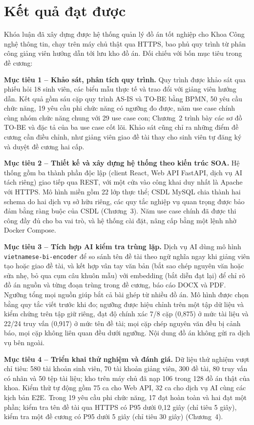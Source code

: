 \documentclass[../main.tex]{subfiles}
\begin{document}
\section*{Kết quả đạt được}

Khóa luận đã xây dựng được hệ thống quản lý đồ án tốt nghiệp cho Khoa Công nghệ thông tin, chạy trên máy chủ thật qua HTTPS, bao phủ quy trình từ phân công giảng viên hướng dẫn tới lưu kho đồ án. Đối chiếu với bốn mục tiêu trong đề cương:

\textbf{Mục tiêu 1 -- Khảo sát, phân tích quy trình.} Quy trình được khảo sát qua phiếu hỏi 18 sinh viên, các biểu mẫu thực tế và trao đổi với giảng viên hướng dẫn. Kết quả gồm sáu cặp quy trình AS-IS và TO-BE bằng BPMN, 50 yêu cầu chức năng, 19 yêu cầu phi chức năng có ngưỡng đo được, năm use case chính cùng nhóm chức năng chung với 29 use case con; Chương~2 trình bày các sơ đồ TO-BE và đặc tả của ba use case cốt lõi. Khảo sát cũng chỉ ra những điểm đề cương cần điều chỉnh, như giảng viên giao đề tài thay cho sinh viên tự đăng ký và duyệt đề cương hai cấp.

\textbf{Mục tiêu 2 -- Thiết kế và xây dựng hệ thống theo kiến trúc SOA.} Hệ thống gồm ba thành phần độc lập (client React, Web API FastAPI, dịch vụ AI tách riêng) giao tiếp qua REST, với một cửa vào công khai duy nhất là Apache với HTTPS. Mô hình miền gồm 22 lớp thực thể; CSDL MySQL chia thành hai schema do hai dịch vụ sở hữu riêng, các quy tắc nghiệp vụ quan trọng được bảo đảm bằng ràng buộc của CSDL (Chương~3). Năm use case chính đã được thi công đầy đủ cho ba vai trò, và hệ thống cài đặt, nâng cấp bằng một lệnh nhờ Docker Compose.

\textbf{Mục tiêu 3 -- Tích hợp AI kiểm tra trùng lặp.} Dịch vụ AI dùng mô hình \texttt{vietnamese-bi-encoder} để so sánh tên đề tài theo ngữ nghĩa ngay khi giảng viên tạo hoặc giao đề tài, và kết hợp vân tay văn bản (bắt sao chép nguyên văn hoặc sửa nhẹ, bỏ qua cụm câu khuôn mẫu) với embedding (bắt diễn đạt lại) để chỉ rõ đồ án nguồn và từng đoạn trùng trong đề cương, báo cáo DOCX và PDF. Ngưỡng tổng mọi nguồn giúp bắt cả bài ghép từ nhiều đồ án. Mô hình được chọn bằng quy tắc viết trước khi đo; ngưỡng được hiệu chỉnh trên một tập dữ liệu và kiểm chứng trên tập giữ riêng, đạt độ chính xác 7/8 cặp (0,875) ở mức tài liệu và 22/24 truy vấn (0,917) ở mức tên đề tài; mọi cặp chép nguyên văn đều bị cảnh báo, mọi cặp không liên quan đều dưới ngưỡng. Nội dung đồ án không gửi ra dịch vụ bên ngoài.

\textbf{Mục tiêu 4 -- Triển khai thử nghiệm và đánh giá.} Dữ liệu thử nghiệm vượt chỉ tiêu: 580 tài khoản sinh viên, 70 tài khoản giảng viên, 300 đề tài, 80 truy vấn có nhãn và 50 tệp tài liệu; kho trên máy chủ đã nạp 106 trong 128 đồ án thật của khoa. Kiểm thử tự động gồm 75 ca cho Web API, 32 ca cho dịch vụ AI cùng các kịch bản E2E. Trong 19 yêu cầu phi chức năng, 17 đạt hoàn toàn và hai đạt một phần; kiểm tra tên đề tài qua HTTPS có P95 dưới 0,12 giây (chỉ tiêu 5 giây), kiểm tra một đề cương có P95 dưới 5 giây (chỉ tiêu 30 giây) (Chương~4).
\end{document}
